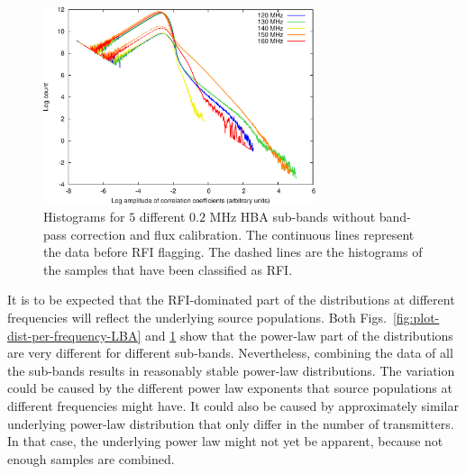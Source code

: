 \documentclass[useAMS,usenatbib]{mn2e}
\begin{document}
\begin{figure}
\begin{center}
\includegraphics[width=8cm]{img/plot-hba-dist-per-frequency-trimmed}
\caption{Histograms for $5$ different $0.2$ MHz HBA sub-bands without band-pass correction and flux calibration. The continuous lines represent the data before RFI flagging. The dashed lines are the histograms of the samples that have been classified as RFI.}
\label{fig:plot-dist-per-frequency-HBA}
\end{center}
\end{figure}

It is to be expected that the RFI-dominated part of the distributions at different frequencies will reflect the underlying source populations. Both Figs.~\ref{fig:plot-dist-per-frequency-LBA} and \ref{fig:plot-dist-per-frequency-HBA} show that the power-law part of the distributions are very different for different sub-bands. Nevertheless, combining the data of all the sub-bands results in reasonably stable power-law distributions. The variation could be caused by the different power law exponents that source populations at different frequencies might have. It could also be caused by approximately similar underlying power-law distribution that only differ in the number of transmitters. In that case, the underlying power law might not yet be apparent, because not enough samples are combined.
\end{document}
